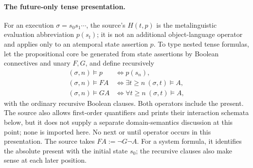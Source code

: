 \paragraph{The future-only tense presentation.}
For an execution \(\sigma=s_0s_1\cdots\), the source's
\(H(t,p)\) is the metalinguistic evaluation abbreviation \(p(s_t)\); it is not
an additional object-language operator and applies only to an atemporal state
assertion \(p\).  To type nested tense formulas, let the propositional core be
generated from state assertions by Boolean connectives and unary \(F,G\), and
define recursively
\[
\begin{aligned}
 (\sigma,n)\models p
 &\Longleftrightarrow p(s_n),\\
 (\sigma,n)\models FA
 &\Longleftrightarrow
   \exists t\ge n\ (\sigma,t)\models A,\\
 (\sigma,n)\models GA
 &\Longleftrightarrow
   \forall t\ge n\ (\sigma,t)\models A,
\end{aligned}
\]
with the ordinary recursive Boolean clauses.  Both operators include the
present.  The source also allows first-order quantifiers and prints their
interaction schemata below, but it does not supply a separate domain-semantics
discussion at this point; none is imported here.  No next or until operator
occurs in this presentation.  The source takes
\(FA:=\neg G\neg A\).  For a system formula, it identifies the absolute
present with the initial state \(s_0\); the recursive clauses also make sense
at each later position.

